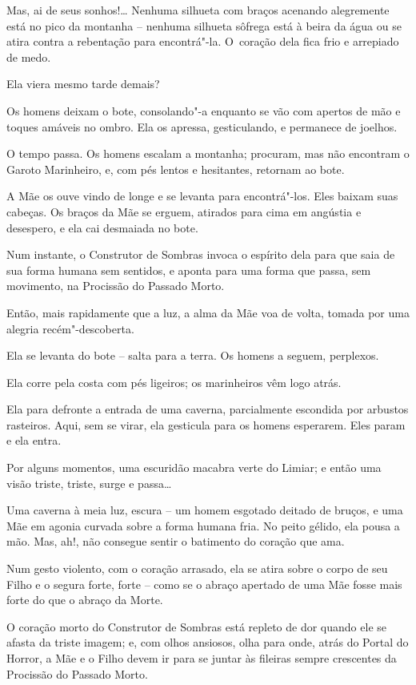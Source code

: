 Mas, ai de seus sonhos!… Nenhuma silhueta com braços acenando
alegremente está no pico da montanha -- nenhuma silhueta sôfrega está à
beira da água ou se atira contra a rebentação para encontrá"-la. O~coração dela fica frio e arrepiado de medo.

Ela viera mesmo tarde demais?

Os homens deixam o bote, consolando"-a enquanto se vão com apertos de mão
e toques amáveis no ombro. Ela os apressa, gesticulando, e permanece de
joelhos.

\smallskip
O tempo passa. Os homens escalam a montanha; procuram, mas não encontram
o Garoto Marinheiro, e, com pés lentos e hesitantes, retornam ao bote.

\smallskip
A Mãe os ouve vindo de longe e se levanta para encontrá"-los. Eles baixam
suas cabeças. Os braços da Mãe se erguem, atirados para cima em angústia
e desespero, e ela cai desmaiada no bote.

Num instante, o Construtor de Sombras invoca o espírito dela para que
saia de sua forma humana sem sentidos, e aponta para uma forma que
passa, sem movimento, na Procissão do Passado Morto.

Então, mais rapidamente que a luz, a alma da Mãe voa de volta, tomada
por uma alegria recém"-descoberta.

Ela se levanta do bote -- salta para a terra. Os homens a seguem,
perplexos.

Ela corre pela costa com pés ligeiros; os marinheiros vêm logo atrás.

Ela para defronte a entrada de uma caverna, parcialmente escondida por
arbustos rasteiros. Aqui, sem se virar, ela gesticula para os homens
esperarem. Eles param e ela entra.

\smallskip
Por alguns momentos, uma escuridão macabra verte do Limiar; e então uma
visão triste, triste, surge e passa…

Uma caverna à meia luz, escura -- um homem esgotado deitado de bruços, e
uma Mãe em agonia curvada sobre a forma humana fria. No peito gélido,
ela pousa a mão. Mas, ah!, não consegue sentir o batimento do coração
que ama.

Num gesto violento, com o coração arrasado, ela se atira sobre o corpo
de seu Filho e o segura forte, forte -- como se o abraço apertado de uma
Mãe fosse mais forte do que o abraço da Morte.

\smallskip
O coração morto do Construtor de Sombras está repleto de dor quando ele
se afasta da triste imagem; e, com olhos ansiosos, olha para onde, atrás
do Portal do Horror, a Mãe e o Filho devem ir para se juntar às fileiras
sempre crescentes da Procissão do Passado Morto.

